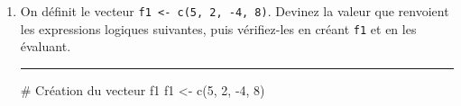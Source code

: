 \documentclass[12pt,twosided, notitlepage]{book}
\newenvironment{Shaded}{}{}
\newcommand{\KeywordTok}[1]{\textcolor[rgb]{0.00,0.00,1.00}{#1}}
\newcommand{\DecValTok}[1]{#1}
\newcommand{\StringTok}[1]{\textcolor[rgb]{0.00,0.50,0.50}{#1}}
\newcommand{\CommentTok}[1]{\textcolor[rgb]{0.00,0.50,0.00}{#1}}
\newcommand{\OperatorTok}[1]{#1}
\newcommand{\NormalTok}[1]{#1}
\newif \ifsol
\renewenvironment{Shaded}{\begin{snugshade}}{\end{snugshade}}
\begin{document}
\begin{enumerate}
\def\labelenumi{\alph{enumi}.}
\item
  On définit le vecteur \texttt{f1\ \textless{}-\ c(5,\ 2,\ -4,\ 8)}.
  Devinez la valeur que renvoient les expressions logiques suivantes,
  puis vérifiez-les en créant \texttt{f1} et en les
  évaluant.\index{\texttt{==}}\index{\texttt{<}}\index{\texttt{\&}}

\begin{Shaded}
\end{Shaded}

  \ifsol 

  \begin{center} \rule{0.5\linewidth}{\linethickness}\end{center}

\begin{Shaded}
\begin{Highlighting}[]
\CommentTok{# Création du vecteur f1}
\NormalTok{f1 <-}\StringTok{ }\KeywordTok{c}\NormalTok{(}\DecValTok{5}\NormalTok{, }\DecValTok{2}\NormalTok{, }\OperatorTok{-}\DecValTok{4}\NormalTok{, }\DecValTok{8}\NormalTok{)}


\end{Highlighting}
\end{Shaded}
\end{enumerate}
\end{document}
